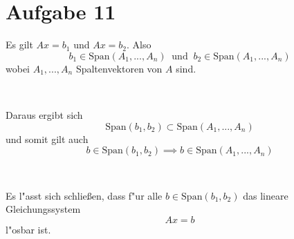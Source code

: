 \section{Aufgabe 11}

Es gilt $Ax = b_1$ und $Ax = b_2$. Also
\begin{equation*}
    b_1 \in \text{Span}(A_1,...,A_n)\ \text{ und }\ b_2 \in \text{Span}(A_1,...,A_n)
\end{equation*}
wobei $A_1,...,A_n$ Spaltenvektoren von $A$ sind.

\ 

Daraus ergibt sich
\begin{equation*}
    \text{Span}(b_1, b_2) \subset \text{Span}(A_1,...,A_n)
\end{equation*}
und somit gilt auch
\begin{equation*}
    b \in \text{Span}(b_1, b_2) \implies b \in \text{Span}(A_1,...,A_n)
\end{equation*}

\

Es l"asst sich schlie{\ss}en, dass f"ur alle $b \in \text{Span}(b_1, b_2)$ das
lineare Gleichungssystem
\begin{equation*}
    Ax = b
\end{equation*}
l"osbar ist.
